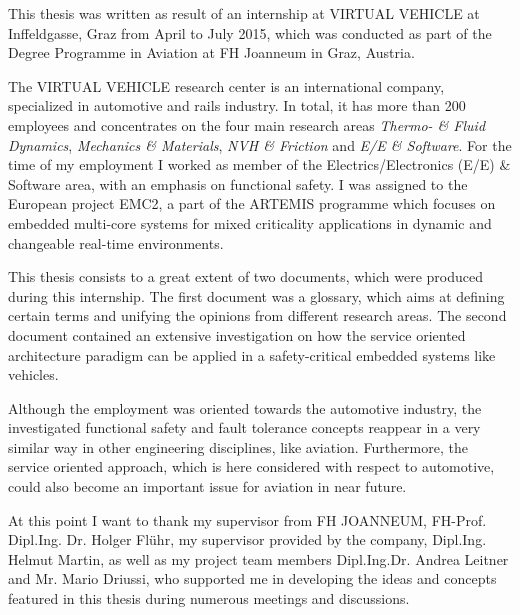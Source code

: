 This thesis was written as result of an internship at VIRTUAL VEHICLE at Inffeldgasse, Graz from April to July 2015, which was conducted as part of the Degree Programme in Aviation at FH Joanneum in Graz, Austria.

The VIRTUAL VEHICLE research center is an international company, specialized in automotive and rails industry. In total, it has more than 200 employees and concentrates on the four main research areas \emph{Thermo- \& Fluid Dynamics}, \emph{Mechanics \& Materials}, \emph{NVH \& Friction} and \emph{E/E \& Software}. For the time of my employment I worked as member of the Electrics/Electronics (E/E) \& Software area, with an emphasis on functional safety. I was assigned to the European project EMC2, a part of the ARTEMIS programme which focuses on embedded multi-core systems for mixed criticality applications in dynamic and changeable real-time environments. 

This thesis consists to a great extent of two documents, which were produced during this internship. The first document was a glossary, which aims at defining certain terms and unifying the opinions from different research areas. The second document contained an extensive investigation on how the service oriented architecture paradigm can be applied in a safety-critical embedded systems like vehicles.

Although the employment was oriented towards the automotive industry, the investigated functional safety and fault tolerance concepts reappear in a very similar way in other engineering disciplines, like aviation. Furthermore, the service oriented approach, which is here considered with respect to automotive, could also become an important issue for aviation in near future.

At this point I want to thank my supervisor from FH JOANNEUM, FH-Prof. Dipl.Ing. Dr. Holger Flühr, my supervisor provided by the company, Dipl.Ing. Helmut Martin, as well as my project team members Dipl.Ing.Dr. Andrea Leitner and Mr. Mario Driussi, who supported me in developing the ideas and concepts featured in this thesis during numerous meetings and discussions.